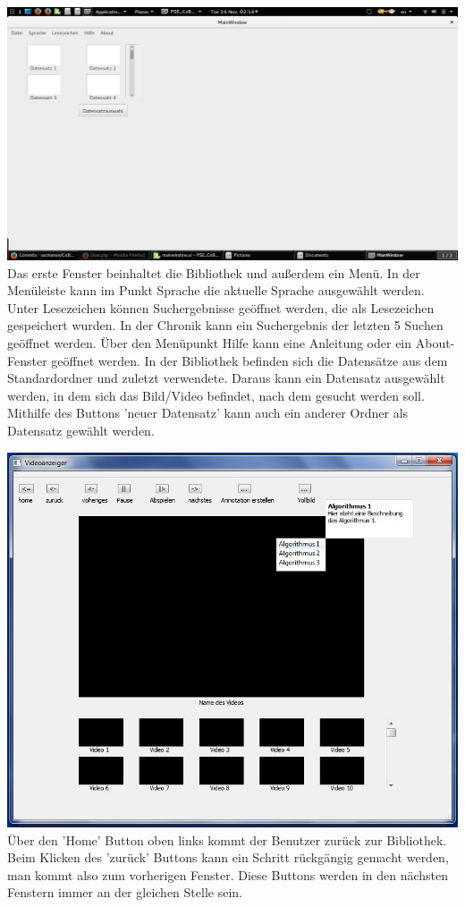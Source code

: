 \includegraphics[width=1\linewidth]{img/MainWindow}
Das erste Fenster beinhaltet die Bibliothek und außerdem ein Menü. In der Menüleiste kann im Punkt Sprache die aktuelle Sprache ausgewählt werden. Unter Lesezeichen können Suchergebnisse geöffnet werden, die als Lesezeichen gespeichert wurden. In der Chronik kann ein Suchergebnis der letzten 5 Suchen geöffnet werden. Über den Menüpunkt Hilfe kann eine Anleitung oder ein About-Fenster geöffnet werden.
In der Bibliothek befinden sich die Datensätze aus dem Standardordner und zuletzt verwendete. Daraus kann ein Datensatz ausgewählt werden, in dem sich das Bild/Video befindet, nach dem gesucht werden soll. Mithilfe des Buttons 'neuer Datensatz' kann auch ein anderer Ordner als Datensatz gewählt werden.

\includegraphics[width=1\linewidth]{img/Videoanzeiger}
Über den 'Home' Button oben links kommt der Benutzer zurück zur Bibliothek. Beim Klicken des 'zurück' Buttons kann ein Schritt rückgängig gemacht werden, man kommt also zum vorherigen Fenster. Diese Buttons werden in den nächsten Fenstern immer an der gleichen Stelle sein.

